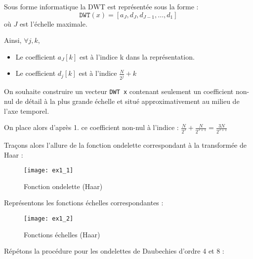 \documentclass[12pt,a4paper,titlepage]{article}
\begin{document}
\begin{enumerate}

    \item{Sous forme informatique la DWT est représentée sous la forme :
            $$ \texttt{DWT}(x) = [a_J, d_J, d_{J-1}, \dots, d_1] $$ où $J$ est l'échelle maximale.

            Ainsi, $\forall j, k$,

            \begin{itemize}
                \item{Le coefficient $a_J[k]$ est à l'indice k dans la représentation.}
                \item{Le coefficient $d_j[k]$ est à l'indice $ \frac{N}{2^j} + k  $}
            \end{itemize}
        }

    \item{ On souhaite construire un vecteur \texttt{DWT x} contenant seulement un coefficient non-nul
            de détail à la plus grande échelle et situé approximativement au milieu de l'axe temporel.

            On place alors d'après 1. ce coefficient non-nul à l'indice :
            $ \frac{N}{2^J} + \frac{N}{2^{J+1}} = \frac{3N}{2^{J+1}} $

        \item{Traçons alors l'allure de la fonction ondelette correspondant à la transformée de
                Haar :

                \begin{figure}[H]
                    \caption{Fonction ondelette (Haar)}
                    \texttt{[image: ex1\_1]}
                    \centering
                \end{figure}
            }

        \item{Représentons les fonctions échelles correspondantes :

                \begin{figure}[H]
                    \caption{Fonctions échelles (Haar)}
                    \texttt{[image: ex1\_2]}
                    \centering
                \end{figure}
            }

        \setcounter{enumi}{5}

        \item{Répétons la procédure pour les ondelettes de Daubechies d'ordre 4 et 8 :

}}
\end{enumerate}
\end{document}
